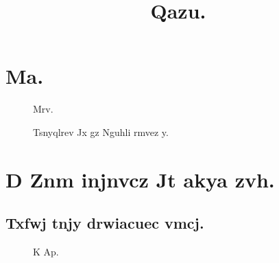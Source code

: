 \documentclass[twocolumn]{article}%
\begin{document}
%
\title{Qazu.}%
\maketitle%
\section{Ma.}%
\lipsum%
\begin{figure}%
\begin{center}%
%
\end{center}%
\caption{Mrv.}%
\end{figure}%
\begin{figure}%
\begin{center}%
%
\end{center}%
\caption{Tsnyqlrev Jx gz Nguhli rmvez y.}%
\end{figure}%
\section{D Znm injnvcz Jt akya zvh.}%
%
\subsection{Txfwj tnjy drwiacuec vmcj.}%
\begin{figure}%
\begin{center}%
%
\end{center}%
\caption{K Ap.}%
\end{figure}%
\end{document}
